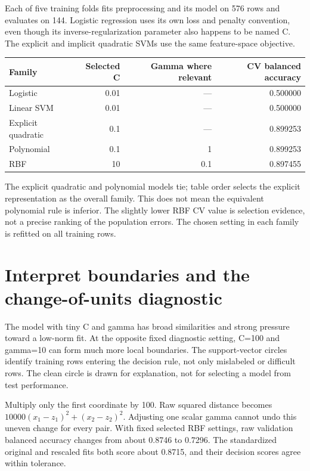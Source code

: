 Each of five training folds fits preprocessing and its model on 576 rows and evaluates on 144.
Logistic regression uses its own loss and penalty convention, even though its inverse-regularization parameter
also happens to be named C. The explicit and implicit quadratic SVMs use the same feature-space objective.
\begin{center}\begin{tabular}{lrrr}\toprule
Family&Selected C&Gamma where relevant&CV balanced accuracy\\\midrule
Logistic&0.01&---&0.500000\\
Linear SVM&0.01&---&0.500000\\
Explicit quadratic&0.1&---&0.899253\\
Polynomial&0.1&1&0.899253\\
RBF&10&0.1&0.897455\\\bottomrule\end{tabular}\end{center}
The explicit quadratic and polynomial models tie; table order selects the explicit representation as the overall family.
This does not mean the equivalent polynomial rule is inferior. The slightly lower RBF CV value is selection evidence,
not a precise ranking of the population errors. The chosen setting in each family is refitted on all training rows.

\section{Interpret boundaries and the change-of-units diagnostic}
The model with tiny C and gamma has broad similarities and strong pressure toward a low-norm fit.
At the opposite fixed diagnostic setting, C=100 and gamma=10 can form much more local boundaries.
The support-vector circles identify training rows entering the decision rule, not only mislabeled or difficult rows.
The clean circle is drawn for explanation, not for selecting a model from test performance.

Multiply only the first coordinate by 100. Raw squared distance becomes
$10000(x_1-z_1)^2+(x_2-z_2)^2$. Adjusting one scalar gamma cannot undo this uneven change for every pair.
With fixed selected RBF settings, raw validation balanced accuracy changes from about 0.8746 to 0.7296.
The standardized original and rescaled fits both score about 0.8715, and their decision scores agree within tolerance.

